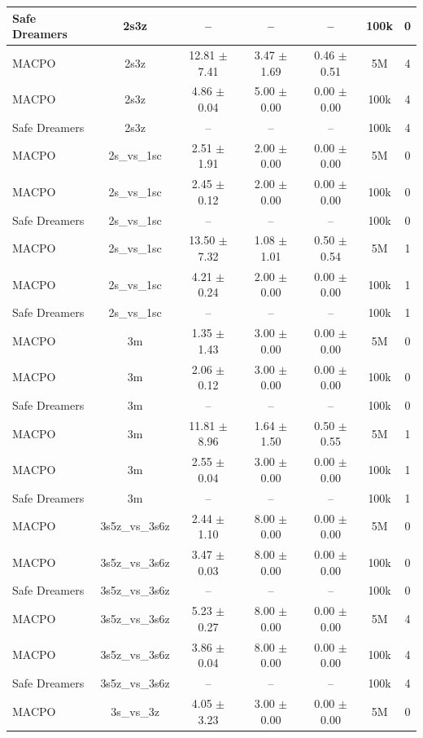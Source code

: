 \begin{longtable}{lcccccc}
Safe Dreamers & 2s3z & -- & -- & -- & 100k & 0 \\
\midrule
MACPO & 2s3z & 12.81 $\pm$ 7.41 & 3.47 $\pm$ 1.69 & 0.46 $\pm$ 0.51 & 5M & 4 \\
MACPO & 2s3z & 4.86 $\pm$ 0.04 & 5.00 $\pm$ 0.00 & 0.00 $\pm$ 0.00 & 100k & 4 \\
Safe Dreamers & 2s3z & -- & -- & -- & 100k & 4 \\
\midrule
MACPO & 2s\_vs\_1sc & 2.51 $\pm$ 1.91 & 2.00 $\pm$ 0.00 & 0.00 $\pm$ 0.00 & 5M & 0 \\
MACPO & 2s\_vs\_1sc & 2.45 $\pm$ 0.12 & 2.00 $\pm$ 0.00 & 0.00 $\pm$ 0.00 & 100k & 0 \\
Safe Dreamers & 2s\_vs\_1sc & -- & -- & -- & 100k & 0 \\
\midrule
MACPO & 2s\_vs\_1sc & 13.50 $\pm$ 7.32 & 1.08 $\pm$ 1.01 & 0.50 $\pm$ 0.54 & 5M & 1 \\
MACPO & 2s\_vs\_1sc & 4.21 $\pm$ 0.24 & 2.00 $\pm$ 0.00 & 0.00 $\pm$ 0.00 & 100k & 1 \\
Safe Dreamers & 2s\_vs\_1sc & -- & -- & -- & 100k & 1 \\
\midrule
MACPO & 3m & 1.35 $\pm$ 1.43 & 3.00 $\pm$ 0.00 & 0.00 $\pm$ 0.00 & 5M & 0 \\
MACPO & 3m & 2.06 $\pm$ 0.12 & 3.00 $\pm$ 0.00 & 0.00 $\pm$ 0.00 & 100k & 0 \\
Safe Dreamers & 3m & -- & -- & -- & 100k & 0 \\
\midrule
MACPO & 3m & 11.81 $\pm$ 8.96 & 1.64 $\pm$ 1.50 & 0.50 $\pm$ 0.55 & 5M & 1 \\
MACPO & 3m & 2.55 $\pm$ 0.04 & 3.00 $\pm$ 0.00 & 0.00 $\pm$ 0.00 & 100k & 1 \\
Safe Dreamers & 3m & -- & -- & -- & 100k & 1 \\
\midrule
MACPO & 3s5z\_vs\_3s6z & 2.44 $\pm$ 1.10 & 8.00 $\pm$ 0.00 & 0.00 $\pm$ 0.00 & 5M & 0 \\
MACPO & 3s5z\_vs\_3s6z & 3.47 $\pm$ 0.03 & 8.00 $\pm$ 0.00 & 0.00 $\pm$ 0.00 & 100k & 0 \\
Safe Dreamers & 3s5z\_vs\_3s6z & -- & -- & -- & 100k & 0 \\
\midrule
MACPO & 3s5z\_vs\_3s6z & 5.23 $\pm$ 0.27 & 8.00 $\pm$ 0.00 & 0.00 $\pm$ 0.00 & 5M & 4 \\
MACPO & 3s5z\_vs\_3s6z & 3.86 $\pm$ 0.04 & 8.00 $\pm$ 0.00 & 0.00 $\pm$ 0.00 & 100k & 4 \\
Safe Dreamers & 3s5z\_vs\_3s6z & -- & -- & -- & 100k & 4 \\
\midrule
MACPO & 3s\_vs\_3z & 4.05 $\pm$ 3.23 & 3.00 $\pm$ 0.00 & 0.00 $\pm$ 0.00 & 5M & 0 \\

\end{longtable}
